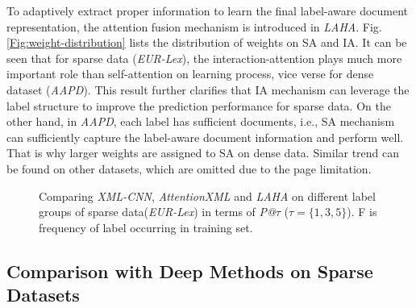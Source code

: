\documentclass[runningheads]{llncs}
\begin{document}
To adaptively extract proper information to learn the final label-aware document representation, the attention fusion mechanism is introduced in \textit{LAHA}. Fig.\ref{Fig:weight-distribution} lists the distribution of weights on SA and IA. It can be seen that for sparse data (\textit{EUR-Lex}), the interaction-attention plays much more important role than self-attention on learning process, vice verse for dense dataset (\textit{AAPD}). This result further clarifies that IA mechanism can leverage the label structure to improve the prediction performance for sparse data. On the other hand, in \textit{AAPD}, each label has sufficient documents, i.e., SA mechanism can sufficiently capture the label-aware document information and perform well. That is why larger weights are assigned to SA on dense data. 
Similar trend can be found on other datasets, which are omitted due to the page limitation.


\begin{figure}[h]\centering
	\setlength{\abovecaptionskip}{0.cm}
	\setlength{\belowcaptionskip}{-0.cm}	
	\caption{Comparing 
		\textit{XML-CNN}, \textit{AttentionXML} and \textit{LAHA} on different label groups of sparse data(\textit{EUR-Lex}) in terms of \textit{P@$\tau$} ($\tau=\{1,3,5\}$). F is frequency of label occurring in training set.} \label{Fig:group-result1}
\end{figure}

\subsection{Comparison with Deep Methods on Sparse Datasets}
\end{document}
